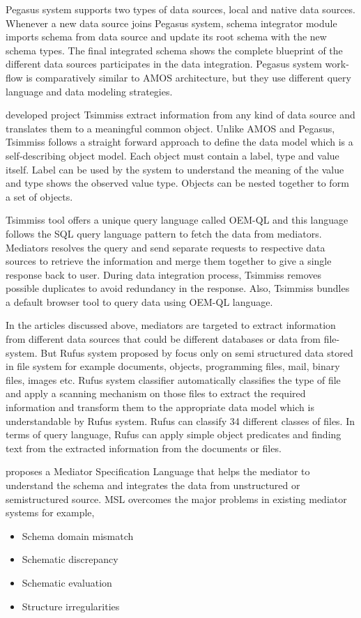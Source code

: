 	
	
	Pegasus system supports two types of data sources, local and native data sources. Whenever a new data source joins Pegasus system, schema integrator module imports schema from data source and update its root schema with the new schema types. The final integrated schema shows the complete blueprint of the different data sources participates in the data integration. Pegasus system work-flow is comparatively similar to AMOS architecture, but they use different query language and data modeling strategies.
	
	\citet{chawathe1994tsimmis} developed project Tsimmiss extract information from any kind of data source and translates them to a meaningful common object. Unlike AMOS and Pegasus, Tsimmiss follows a straight forward approach to define the data model which is a self-describing object model. Each object must contain a label, type and value itself. Label can be used by the system to understand the meaning of the value and type shows the observed value type. Objects can be nested together to form a set of objects. 
	
	Tsimmiss tool offers a unique query language called OEM-QL and this language follows the SQL query language pattern to fetch the data from mediators. Mediators resolves the query and send separate requests to respective data sources to retrieve the information and merge them together to give a single response back to user. During data integration process, Tsimmiss removes possible duplicates to avoid redundancy in the response. Also, Tsimmiss bundles a default browser tool to query data using OEM-QL language.
	
	In the articles discussed above, mediators are targeted to extract information from different data sources that could be different databases or data from file-system. But Rufus system proposed by \citet{shoens1993rufus} focus only on semi structured data stored in file system for example documents, objects, programming files, mail, binary files, images etc. Rufus system classifier automatically classifies the type of file and apply a scanning mechanism on those files to extract the required information and transform them to the appropriate data model which is understandable by Rufus system. Rufus can classify 34 different classes of files. In terms of query language, Rufus can apply simple object predicates and finding text from the extracted information from the documents or files.
	
	\citet{papakonstantinou1996medmaker} proposes a Mediator Specification Language that helps the mediator to understand the schema and integrates the data from unstructured or semistructured source. MSL overcomes the major problems in existing mediator systems for example,
	\begin{itemize}
		\item Schema domain mismatch 
		\item Schematic discrepancy
		\item Schematic evaluation
		\item Structure irregularities
	\end{itemize}
	
